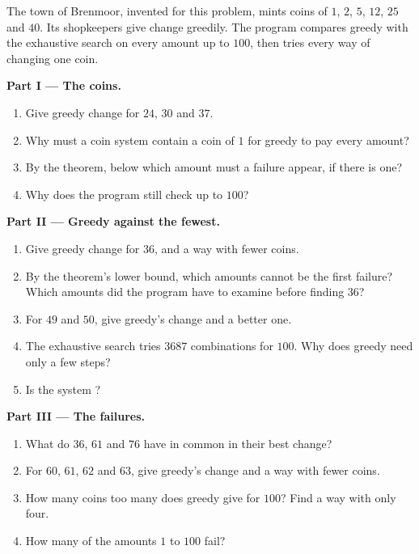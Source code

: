 \begin{problem}\label{pb:g11:greedy-algorithms:1}
The town of Brenmoor, invented for this problem, mints coins of $1$, $2$, $5$, $12$, $25$ and $40$. Its shopkeepers give
change greedily. The program compares greedy with the exhaustive search on every amount up to $100$, then tries every
way of changing one coin.

\label{lst:g11:greedy-algorithms:brenmoor}

\label{out:g11:greedy-algorithms:brenmoor}

\medskip\noindent\textbf{Part I --- The coins.}
\begin{enumerate}
  \item Give greedy change for $24$, $30$ and $37$.
  \item Why must a coin system contain a coin of $1$ for greedy to pay every amount?
  \item By the theorem, below which amount must a failure appear, if there is one?
  \item Why does the program still check up to $100$?
\end{enumerate}

\medskip\noindent\textbf{Part II --- Greedy against the fewest.}
\begin{enumerate}[resume]
  \item Give greedy change for $36$, and a way with fewer coins.
  \item By the theorem's lower bound, which amounts cannot be the first failure? Which amounts did the program have to
    examine before finding $36$?
  \item For $49$ and $50$, give greedy's change and a better one.
  \item The exhaustive search tries $3687$ combinations for $100$. Why does greedy need only a few steps?
  \item Is the system ?
\end{enumerate}

\medskip\noindent\textbf{Part III --- The failures.}
\begin{enumerate}[resume]
  \item What do $36$, $61$ and $76$ have in common in their best change?
  \item For $60$, $61$, $62$ and $63$, give greedy's change and a way with fewer coins.
  \item How many coins too many does greedy give for $100$? Find a way with only four.
  \item How many of the amounts $1$ to $100$ fail?
\end{enumerate}


\end{problem}
